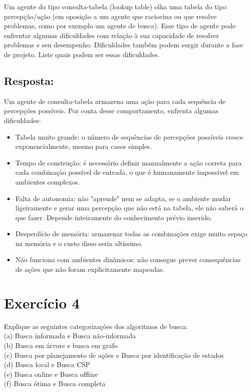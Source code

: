 \documentclass[a4paper,12pt]{article}
\begin{document}
Um agente do tipo consulta-tabela (lookup table) olha uma tabela
do tipo percepção/ação (em oposição a um agente que raciocina ou que resolve
problemas, como por exemplo um agente de busca). Esse tipo de agente pode
enfrentar algumas dificuldades com relação à sua capacidade de resolver problemas e
seu desempenho. Dificuldades também podem surgir durante a fase de projeto. Liste
quais podem ser essas dificuldades.

\subsection*{Resposta:}

\bigskip

Um agente de consulta-tabela armazena uma ação para cada sequência de percepções possíveis. Por conta desse comportamento, enfrenta algumas dificuldades:

\begin{itemize}
	\item Tabela muito grande: o número de sequências de percepções possíveis cresce exponencialmente, mesmo para casos simples.
	\item Tempo de construção: é necessário definir manualmente a ação correta para cada combinação possível de entrada, o que é humanamente impossível em ambientes complexos.
	\item Falta de autonomia: não "aprende" nem se adapta, se o ambiente mudar ligeiramente e gerar uma percepção que não está na tabela, ele não saberá o que fazer. Depende inteiramente do conhecimento prévio inserido.
	\item Desperdício de memória: armazenar todas as combinações exige muito espaço na memória e o custo disso seria altíssimo.
	\item Não funciona com ambientes dinâmicos: não consegue prever consequências de ações que não foram explicitamente mapeadas.
\end{itemize}


\newpage
\section*{Exercício 4}

Explique as seguintes categorizações dos algoritmos de busca:\\
(a) Busca informada e Busca não-informada\\
(b) Busca em árvore e busca em grafo\\
(c) Busca por planejamento de ações e Busca por identificação de estados\\
(d) Busca local e Busca CSP\\
(e) Busca online e Busca offline\\
(f) Busca ótima e Busca completa\\
\end{document}
